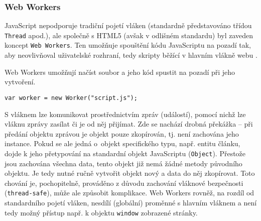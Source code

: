 \subsubsection{Web Workers}
JavaScript nepodporuje tradiční pojetí vláken (standardně představováno třídou \texttt{Thread} apod.), ale společně s HTML5 (avšak v odlišném standardu) byl zaveden koncept \texttt{Web Workers}. Ten umožňuje spouštění kódu JavaScriptu na pozadí tak, aby neovlivňoval uživatelské rozhraní, tedy skripty běžící v hlavním vlákně webu \cite{webworkers}.

Web Workers umožňují načíst soubor a jeho kód spustit na pozadí při jeho vytvoření.
\begin{lstlisting}
var worker = new Worker("script.js");
\end{lstlisting}

S vláknem lze komunikovat prostřednictvím zpráv (událostí), pomocí nichž lze vláknu zprávy zasílat či je od něj přijímat. Zde se nachází drobná překážka -- při předání objektu zprávou je objekt pouze zkopírován, tj. není zachována jeho instance. Pokud se ale jedná o~objekt specifického typu, např. entitu článku, dojde k jeho přetypování na standardní objekt JavaScriptu (\texttt{Object}). Přestože jsou zachována všechna data, tento objekt již nemá žádné metody původního objektu. Je tedy nutné ručně vytvořit objekt nový a data do něj zkopírovat. Toto chování je, pochopitelně, prováděno z důvodu zachování vláknové bezpečnosti (\texttt{thread-safe}), může ale způsobit komplikace. Web Workers rovněž, na rozdíl od standardního pojetí vláken, nesdílí (globální) proměnné s hlavním vláknem a není tedy možný přístup např. k objektu \texttt{window} zobrazené stránky.

